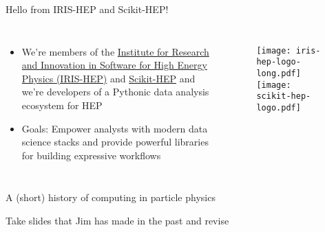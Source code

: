 \begin{frame}{Hello from IRIS-HEP and Scikit-HEP!}
  \begin{columns}
    \Large
    \begin{itemize}\setlength{\itemsep}{0.5 cm}
      \item We're members of the \href{https://iris-hep.org/}{Institute for Research and Innovation in Software for High Energy Physics (IRIS-HEP)} and \href{https://scikit-hep.org/}{Scikit-HEP} and we're developers of a Pythonic data analysis ecosystem for HEP
      \item Goals: Empower analysts with modern data science stacks and provide powerful libraries for building expressive workflows
    \end{itemize}
%
    \begin{figure}
        \begin{center}
            \texttt{[image: iris-hep-logo-long.pdf]}
            \texttt{[image: scikit-hep-logo.pdf]}
        \end{center}
    \end{figure}
  \end{columns}
\end{frame}

\begin{frame}{A (short) history of computing in particle physics}
\vspace{0.1 cm}

\Large
Take slides that Jim has made in the past and revise

\end{frame}
